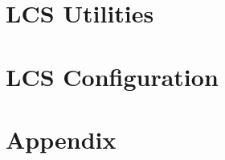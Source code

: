 \documentclass[a4paper, 11pt]{book}
\begin{document}
 	
    
   	
    
    
    
 	\part{LCS Utilities}
 	
 	
   	
    
	
    
    \part{LCS Configuration}
    
    
    
    
    \part{Appendix}   
    
    \appendix 

   	
    
     
    

    
    
        
    \backmatter    
    
    \printindex         
\end{document}
